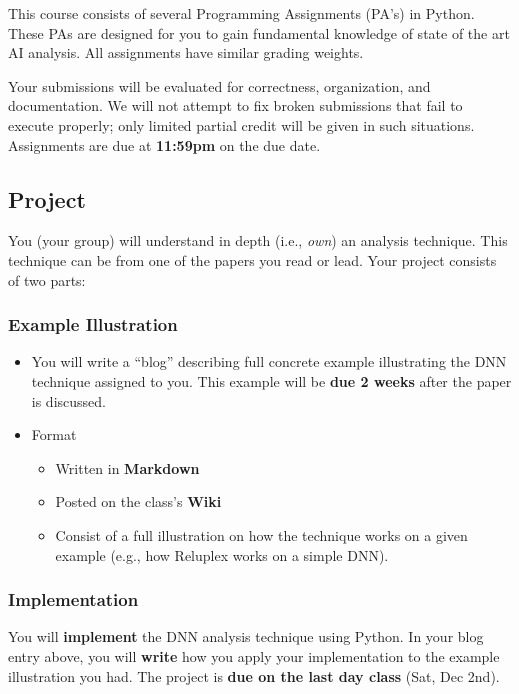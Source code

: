 \documentclass[11pt]{article}
\begin{document}
This course consists of several Programming Assignments (PA's) in Python. These PAs are designed for you to gain fundamental knowledge of state of the art AI analysis. All assignments have similar grading weights.

Your submissions will be evaluated for correctness,
organization, and documentation. We will not attempt to fix broken
submissions that fail to execute properly; only limited partial credit will be given in such situations. Assignments are due at \textbf{11:59pm} on the due date.

    

\subsection{Project}
\label{sec:org6da900e}

You (your group) will understand in depth (i.e., \emph{own}) an analysis technique.  This technique can be from one of the papers you read or lead.  Your project consists of two parts:

\subsubsection{Example Illustration}
\label{sec:orga9923fc}
\begin{itemize}
\item You will write a ``blog'' describing full concrete example illustrating the DNN technique assigned to you. This example will be \textbf{due \textbf{2 weeks}} after the paper is discussed.

\item Format
\begin{itemize}
\item Written in \textbf{Markdown}
\item Posted on the class's \textbf{Wiki}
\item Consist of a full illustration on how the technique works on a given example (e.g., how Reluplex works on a simple DNN).  
\end{itemize}
\end{itemize}


\subsubsection{Implementation}
\label{sec:orgb697dba}

You will \textbf{implement} the DNN analysis technique using Python. In your blog entry above, you will \textbf{write}  how you apply your implementation to the example illustration you had. The project is \textbf{due on the last day class} (Sat, Dec 2nd).
\end{document}
